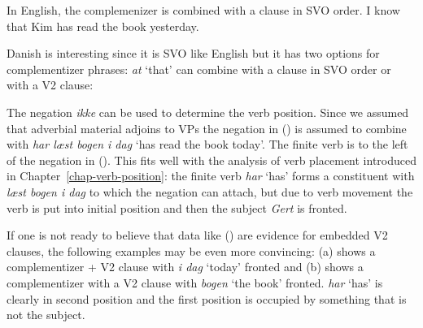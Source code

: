 In English, the complemenizer is combined with a clause in SVO order.
\ea
I  know that Kim has read the book yesterday.
\z


Danish is interesting since it is SVO like English but it has two options for complementizer
phrases: \emph{at} `that' can combine with a clause in SVO order or with a V2 clause:
\z

The negation \emph{ikke} can be used to determine the verb position. Since we assumed that adverbial
material adjoins to VPs the negation in () is assumed to combine with \emph{har læst bogen i
  dag} `has read the book today'. The finite verb is to the left of the negation in (). This
fits well with the analysis of verb placement introduced in Chapter~\ref{chap-verb-position}: the
finite verb \emph{har} `has' forms a constituent with \emph{læst  bogen i dag} to which the negation can attach, but
due to verb movement the verb is put into initial position and then the subject \emph{Gert} is fronted.
\z

If one is not ready to believe that data like () are evidence for embedded V2 clauses, the
following examples may be even more convincing:
\eal
{}
\zl
(a) shows a complementizer + V2 clause with \emph{i dag} `today' fronted and (b) shows
a complementizer with a V2 clause with \emph{bogen} `the book' fronted. \emph{har} `has' is clearly
in second position and the first position is occupied by something that is not the subject.


